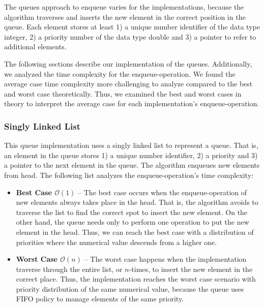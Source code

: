 \documentclass[a4paper,11pt]{kth-mag}
\newcommand*{\skippara}{\par\vspace{\baselineskip} \noindent}
\begin{document}
\skippara The queues approach to enqueue varies for the implementations, because the algorithm traverses and inserts the new element in the correct position in the queue.
Each element stores at least 1) a unique number identifier of the data type integer, 2) a priority number of the data type double and 3) a pointer to refer to additional elements.

\skippara The following sections describe our implementation of the queues.
Additionally, we analyzed the time complexity for the enqueue-operation.
We found the average case time complexity more challenging to analyze compared to the best and worst case theoretically.
Thus, we examined the best and worst cases in theory to interpret the average case for each implementation's enqueue-operation.

\subsubsection{Singly Linked List}\label{sec:singly}
This queue implementation uses a singly linked list to represent a queue.
That is, an element in the queue stores 1) a unique number identifier, 2) a priority and 3) a pointer to the next element in the queue.
The algorithm enqueues new elements from head.
The following list analyzes the enqueue-operation's time complexity:
\begin{itemize}
    \item \textbf{Best Case $\mathcal{O}(1)$} --
        The best case occurs when the enqueue-operation of new elements always takes place in the head.
        That is, the algorithm avoids to traverse the list to find the correct spot to insert the new element.
        On the other hand, the queue needs only to perform one operation to put the new element in the head.
        Thus, we can reach the best case with a distribution of priorities where the numerical value descends from a higher one.
    \item \textbf{Worst Case $\mathcal{O}(n)$} --
        The worst case happens when the implementation traverse through the entire list, or $n$-times, to insert the new element in the correct place.
        Thus, the implementation reaches the worst case scenario with priority distribution of the same numerical value, because the queue uses FIFO policy to manage elements of the same priority.
\end{itemize}
\end{document}
